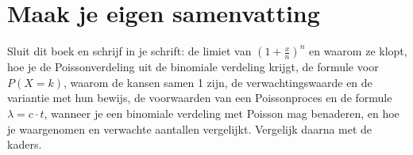 
\begin{oefeningen}






\end{oefeningen}


\ifzelfstudie
\section*{Maak je eigen samenvatting}
Sluit dit boek en schrijf in je schrift: de limiet van $(1 + \frac{x}{n})^n$ en waarom ze klopt, hoe je de Poissonverdeling uit de binomiale verdeling krijgt, de formule voor $P(X = k)$, waarom de kansen samen 1 zijn, de verwachtingswaarde en de variantie met hun bewijs, de voorwaarden van een Poissonproces en de formule $\lambda = c \cdot t$, wanneer je een binomiale verdeling met Poisson mag benaderen, en hoe je waargenomen en verwachte aantallen vergelijkt. Vergelijk daarna met de kaders.
\fi
